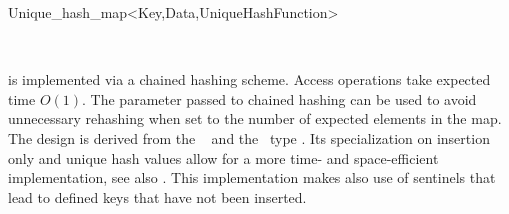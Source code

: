 \begin{ccRefClass}{Unique_hash_map<Key,Data,UniqueHashFunction>}
\vspace*{-5mm}
\ccSeeAlso

\\

\ccImplementation

 is implemented via a chained hashing scheme. Access
operations \ccVar\ccc{[i]} take expected time $O(1)$. The 
parameter passed to chained hashing can be used to avoid unnecessary 
rehashing when set to the number of expected elements in the map.
The design is derived from the \stl\  and the \leda\ type
. Its specialization on insertion only and unique hash values 
allow for a more time- and space-efficient implementation, see also
\cite[Chapter 5]{mn-lpcgc-00}. This implementation makes also use
of sentinels that lead to defined keys that have not been inserted.

\end{ccRefClass}




